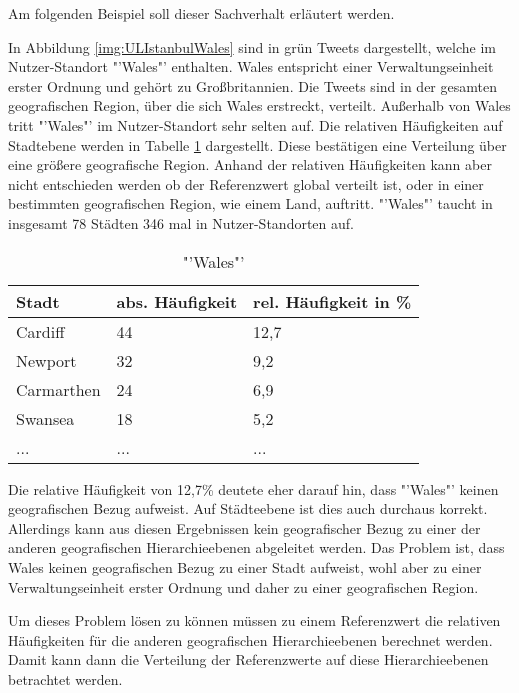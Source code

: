 			Am folgenden Beispiel soll dieser Sachverhalt erläutert werden.

			In Abbildung \ref{img:ULIstanbulWales} sind in grün Tweets dargestellt, welche im Nutzer-Standort "'Wales"' enthalten.
			Wales entspricht einer Verwaltungseinheit erster Ordnung und gehört zu Großbritannien.
			Die Tweets sind in der gesamten geografischen Region, über die sich Wales erstreckt, verteilt.
			Außerhalb von Wales tritt "'Wales"' im Nutzer-Standort sehr selten auf.
			Die relativen Häufigkeiten auf Stadtebene werden in Tabelle \ref{tab:walesCity} dargestellt.
			Diese bestätigen eine Verteilung über eine größere geografische Region.
			Anhand der relativen Häufigkeiten kann aber nicht entschieden werden ob der Referenzwert global verteilt ist, oder in einer bestimmten geografischen Region, wie einem Land, auftritt. 
			"'Wales"' taucht in insgesamt 78 Städten 346 mal in Nutzer-Standorten auf.

			\begin{table}[h]
			\centering
			\caption{"'Wales"'}
			\label{tab:walesCity}
			\begin{tabular}{|l|l|l|}
			\hline
			Stadt      & abs. Häufigkeit & rel. Häufigkeit in \% \\ \hline \hline
			Cardiff    & 44 			 & 12,7 \\ \hline
			Newport    & 32 			 & 9,2  \\ \hline
			Carmarthen & 24 			 & 6,9  \\ \hline
			Swansea    & 18 			 & 5,2  \\ \hline
			...    & ... & ...  \\ \hline
			\end{tabular}
			\end{table}

			Die relative Häufigkeit von 12,7\% deutete eher darauf hin, dass "'Wales"' keinen geografischen Bezug aufweist.
			Auf Städteebene ist dies auch durchaus korrekt. 
			Allerdings kann aus diesen Ergebnissen kein geografischer Bezug zu einer der anderen geografischen Hierarchieebenen abgeleitet werden.
			Das Problem ist, dass Wales keinen geografischen Bezug zu einer Stadt aufweist, wohl aber zu einer Verwaltungseinheit erster Ordnung und daher zu einer geografischen Region. 

			Um dieses Problem lösen zu können müssen zu einem Referenzwert die relativen Häufigkeiten für die anderen geografischen Hierarchieebenen berechnet werden.
			Damit kann dann die Verteilung der Referenzwerte auf diese Hierarchieebenen betrachtet werden.
			
